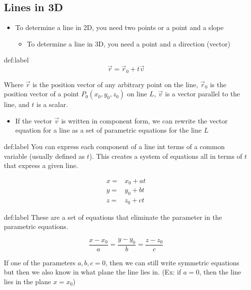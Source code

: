 \documentclass{package/notes}
\begin{document}
\subsection{Lines in 3D}

	\begin{itemize}
		\item To determine a line in 2D, you need two points or a point and a slope
		\begin{itemize}
			\item To determine a line in 3D, you need a point and a direction (vector)
		\end{itemize}
	\end{itemize}

	\begin{definition}{def:label}
		$$\vec r = \vec r_0 + t\vec v$$

		Where $\vec r$ is the position vector of any arbitrary point on the line, $\vec r_0$ is the position vector of a point $P_0(x_0,y_0,z_0)$ on line $L$, $\vec v$ is a vector parallel to the line, and $t$ is a scalar.
	\end{definition}

	\begin{itemize}
		\item If the vector $\vec v$ is written in component form, we can rewrite the vector equation for a line as a set of parametric equations for the line $L$ 
	\end{itemize}

	\begin{definition}{def:label}
		You can express each component of a line int terms of a common variable (usually defined as $t$). This creates a system of equations all in terms of $t$ that express a given line.

		$$
		\begin{aligned}
			x =& x_0 + at\\
			y =& y_0+bt\\
			z =& z_0+ct
		\end{aligned}
		$$
	\end{definition} %

	\begin{definition}{def:label}
		These are a set of equations that eliminate the parameter in the parametric equations.

		$$
		\frac{x-x_0}{a}=\frac{y-y_0}{b}=\frac{z-z_0}{c}
		$$

		If one of the parameters $a,b,c = 0$, then we can still write symmetric equations but then we also know in what plane the line lies in. (Ex: if $a= 0$, then the line lies in the plane $x=x_0$)
	\end{definition} %
\end{document}

